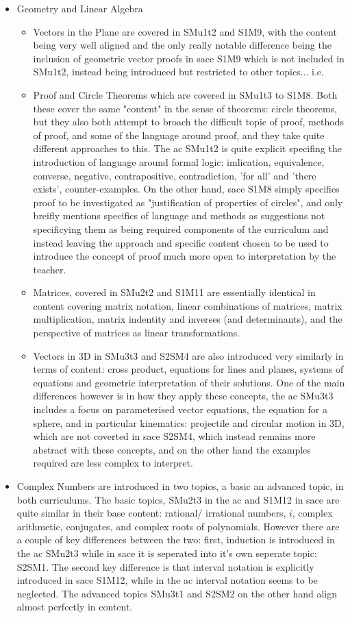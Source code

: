 \documentclass[twoside,12pt,a4paper]{report}
\begin{document}
\begin{itemize}
	\item Geometry and Linear Algebra
		\begin{itemize}
			\item Vectors in the Plane are covered in SMu1t2 and S1M9, with the content being very well aligned and the only really notable difference being the inclusion of geometric vector proofs in \gls{sace} S1M9 which is not included in SMu1t2, instead being introduced but restricted to other topics... i.e.
			\item Proof and Circle Theorems which are covered in SMu1t3 to S1M8. Both these cover the same "content" in the sense of theorems: circle theorems, but they also both attempt to broach the difficult topic of proof, methods of proof, and some of the language around proof, and they take quite different approaches to this. The \gls{ac} SMu1t2 is quite explicit specifing the introduction of language around formal logic: imlication, equivalence, converse, negative, contrapositive, contradiction, 'for all' and 'there exists', counter-examples. On the other hand, \gls{sace} S1M8 simply specifies proof to be investigated as "justification of properties of circles", and only breifly mentions specifics of language and methods as suggestions not specificying them as being required components of the curriculum and instead leaving the approach and specific content chosen to be used to introduce the concept of proof much more open to interpretation by the teacher.
			\item Matrices, covered in SMu2t2 and S1M11 are essentially identical in content covering matrix notation, linear combinations of matrices, matrix multiplication, matrix indentity and inverses (and determinants), and the perspective of matrices as linear transformations. 
			\item Vectors in 3D in SMu3t3 and S2SM4 are also introduced very similarly in terms of content: cross product, equations for lines and planes, systems of equations and geometric interpretation of their solutions.  One of the main differences however is in how they apply these concepts, the \gls{ac} SMu3t3 includes a focus on parameterised vector equations, the equation for a sphere, and in particular kinematics: projectile and circular motion in 3D, which are not coverted in \gls{sace} S2SM4, which instead remains more abstract with these concepts, and on the other hand the examples required are less complex to interpret. 
		\end{itemize}
	\item Complex Numbers are introduced in two topics, a basic an advanced topic, in both curriculums. The basic topics, SMu2t3 in the \gls{ac} and S1M12 in \gls{sace} are quite similar in their base content: rational/ irrational numbers, $i$, complex arithmetic, conjugates, and complex roots of polynomials. However there are a couple of key differences between the two: first, induction is introduced in the \gls{ac} SMu2t3 while in \gls{sace} it is seperated into it's own seperate topic: S2SM1. The second key difference is that interval notation is explicitly introduced in \gls{sace} S1M12, while in the \gls{ac} interval notation seems to be neglected. The advanced topics SMu3t1 and S2SM2 on the other hand align almost perfectly in content.

\end{itemize}
\end{document}
